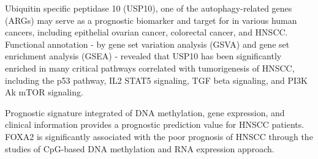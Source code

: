 \documentclass[jpm,article,submit,moreauthors,pdftex]{Definitions/mdpi}
\begin{document}
\begin{paracol}{2}
Ubiquitin specific peptidase 10 (USP10), one of the autophagy-related genes (ARGs) may serve as a prognostic biomarker and target for in various human cancers, including epithelial ovarian cancer, colorectal cancer, and HNSCC\cite{Ren2020}.
Functional annotation - by gene set variation analysis (GSVA) and gene set enrichment analysis (GSEA) - revealed that USP10 has been significantly enriched in many critical pathways correlated with tumorigenesis of HNSCC, including the p53 pathway, IL2 STAT5 signaling, TGF beta signaling, and PI3K Ak mTOR signaling\cite{Ren2020}.

Prognostic signature integrated of DNA methylation, gene expression, and clinical information provides a prognostic prediction value for HNSCC patients. 
FOXA2 is significantly associated with the poor prognosis of HNSCC through the studies of CpG-based DNA methylation and RNA expression approach\cite{Shen2017a}.



\end{paracol}
\end{document}
